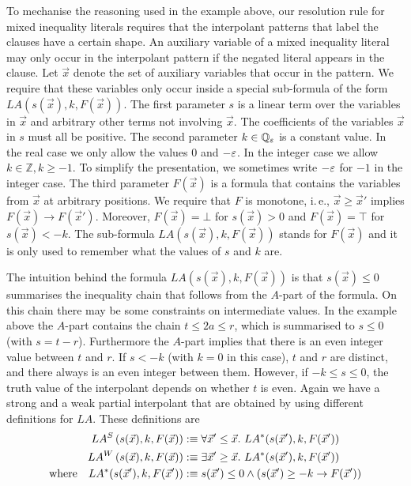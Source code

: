 

To mechanise the reasoning used in the example above, our resolution
rule for mixed inequality literals requires that the interpolant patterns
that label the clauses have a certain shape.  An auxiliary
variable of a mixed inequality literal may only occur in the 
interpolant pattern
if the negated literal appears in the clause.  Let $\vec x$ denote the
set of auxiliary variables that occur in the pattern.  We require 
that these
variables only occur inside a special sub-formula of the form $LA(s(\vec x), k,
F(\vec x))$.  The first parameter $s$ is a linear term over the
variables in $\vec x$ and arbitrary other terms not involving $\vec
x$.  The coefficients of the variables $\vec x$ in $s$ must all be
positive.  The second parameter $k\in \mathbb{Q}_\varepsilon$ is a
constant value.  In the real case we only allow the values $0$ and
$-\varepsilon$. In the integer case we allow $k\in\mathbb{Z}, k\geq -1$.  
To simplify the presentation, we sometimes write $-\varepsilon$ for $-1$ in the integer case.
The third parameter $F(\vec x)$ is a formula that contains the variables
from $\vec x$ at arbitrary positions.
\ifnewinterpolation
We require that $F$ is monotone, i.\,e., $\vec x \geq \vec x'$ implies 
$F(\vec x) \rightarrow F(\vec x')$.  
Moreover, $F(\vec x)=\bot$ for $s(\vec x) > 0$ and
$F(\vec x)=\top$ for $s(\vec x) < -k$.  The sub-formula
$LA(s(\vec x), k, F(\vec x))$ stands for $F(\vec x)$ and it is only
used to remember what the values of $s$ and $k$ are.

The intuition behind the formula $LA(s(\vec x), k, F(\vec x))$ is that
$s(\vec x) \leq 0$ summarises the inequality chain that follows from the $A$-part of
the formula.  On this chain there may be some constraints on
intermediate values.  In the example above the $A$-part contains the
chain $t \leq 2a \leq r$, which is summarised to $s \leq 0$ (with $s=t-r$).
Furthermore the $A$-part implies that there is an even integer value between
$t$ and $r$.  If $s < -k$ (with $k=0$ in this case),  $t$ and $r$ are 
distinct, and there always is an even integer between them.
However, if $-k \leq s \leq 0$, the truth value of the interpolant depends on 
whether $t$ is even. 
\else
Again we have a strong and a weak
partial interpolant that are obtained by using different definitions
for $LA$.  These definitions are
\begin{align*}
LA^S\left(s(\vec x), k, F(\vec x)\right) &:\equiv
  \forall \vec x' \leq \vec x.~ LA^*(s(\vec x'),k,F(\vec x')) \\
LA^W \left(s(\vec x),k,F(\vec x)\right) &:\equiv
  \exists \vec x' \geq \vec x.~ LA^*(s(\vec x'),k,F(\vec x')) \\
\text{where}\quad
LA^*(s(\vec x'),k,F(\vec x')) &:\equiv
s(\vec x') \leq 0 \land 
  (s(\vec x') \geq -k \rightarrow F(\vec x'))
\end{align*}

